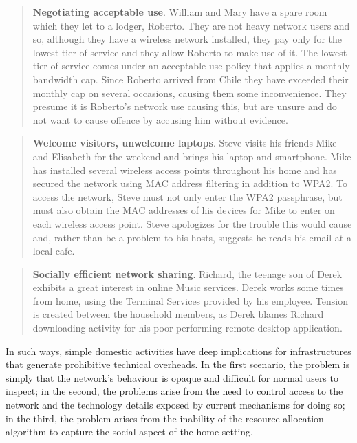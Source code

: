 \begin{quote}
\textbf{Negotiating acceptable use}.  William and Mary have a spare room which
they let to a lodger, Roberto.  They are not heavy network users and so,
although they have a wireless network installed, they pay only for the lowest
tier of service and they allow Roberto to make use of it.  The lowest tier of
service comes under an acceptable use policy that applies a monthly bandwidth
cap.  Since Roberto arrived from Chile they have exceeded their monthly cap on
several occasions, causing them some inconvenience.  They presume it is
Roberto's network use causing this, but are unsure and do not want to cause
offence by accusing him without evidence.
\end{quote}

\begin{quote}
\textbf{Welcome visitors, unwelcome laptops}.  Steve visits his friends Mike and
Elisabeth for the weekend and brings his laptop and smartphone.  Mike has
installed several wireless access points throughout his home and has secured the
network using MAC address filtering in addition to WPA2.  To access the network,
Steve must not only enter the WPA2 passphrase, but must also obtain the MAC
addresses of his devices for Mike to enter on each wireless access point.  Steve
apologizes for the trouble this would cause and, rather than be a problem to his
hosts, suggests he reads his email at a local cafe.
\end{quote}

\begin{quote}
\textbf{Socially efficient network sharing}.  Richard, the teenage son of Derek
exhibits a great interest in online Music services. Derek works some times from
home, using the Terminal Services provided by his employee. Tension is created
between the household members,  as Derek blames Richard downloading activity for
his poor performing remote desktop application. 
\end{quote}

In such ways, simple domestic activities have deep implications for
infrastructures that generate prohibitive technical overheads.  In the first
scenario, the problem is simply that the network's behaviour is opaque and
difficult for normal users to inspect; in the second, the problems arise from
the need to control access to the network and the technology details exposed by
current mechanisms for doing so; in the third, the problem arises from the
inability of the resource allocation algorithm to capture the social aspect of
the home setting.  

